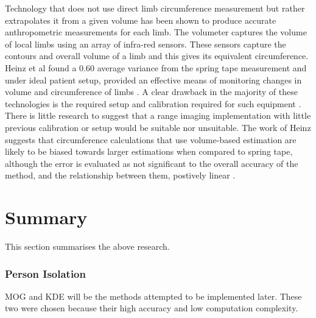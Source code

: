 Technology that does not use direct limb circumference measurement but rather extrapolates it from a given volume has been shown to produce accurate anthropometric measurements for each limb. The volumeter captures the volume of local limbs using an array of infra-red sensors. These sensors capture the contours and overall volume of a limb and this gives its equivalent circumference. Heinz et al found a $0.60$ average variance from the spring tape measurement and under ideal patient setup, provided an effective means of monitoring changes in volume and circumference of limbs \cite{Heinz2000}. A clear drawback in the majority of these technologies is the required setup and calibration required for such equipment \cite{Bauer2011}.\\

There is little research to suggest that a range imaging implementation with little previous calibration or setup would be suitable nor unsuitable. The work of Heinz suggests that circumference calculations that use volume-based estimation are likely to be biased towards larger estimations when compared to spring tape, although the error is evaluated as not significant to the overall accuracy of the method, and the relationship between them, postively linear \cite{Heinz2000}. \\













\pagebreak



\newpage
\section{Summary}
This section summarises the above research.\\

\subsubsection{Person Isolation}
MOG \cite{Stauffer1999} and KDE \cite{Elgammal2000} will be the methods attempted to be implemented later. These two were chosen because their high accuracy and low computation complexity. \\

